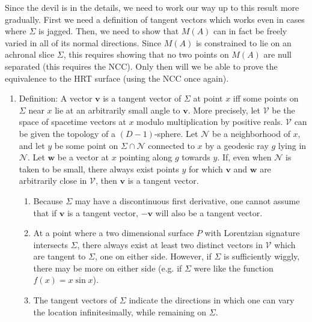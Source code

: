 \documentclass{article}
\begin{document}
Since the devil is in the details, we need to work our way up to this result more gradually.  First we need a definition of tangent vectors which works even in cases where $\Sigma$ is jagged.  Then, we need to show that $M(A)$ can in fact be freely varied in all of its normal directions.  Since $M(A)$ is constrained to lie on an achronal slice $\Sigma$, this requires showing that no two points on $M(A)$ are null separated (this requires the NCC).  Only then will we be able to prove the equivalence to the HRT surface (using the NCC once again).

\begin{enumerate}[resume]
\item Definition: A vector $\mathbf{v}$ is a tangent vector of $\Sigma$ at point $x$ iff some points on $\Sigma$ near $x$ lie at an arbitrarily small angle to $\mathbf{v}$.  More precisely, let $\mathcal{V}$ be the space of spacetime vectors at $x$ modulo multiplication by positive reals.  $\mathcal{V}$ can be given the topology of a $(D-1)$-sphere.  Let $\mathcal{N}$ be a neighborhood of $x$, and let $y$ be some point on $\Sigma \cap \mathcal{N}$ connected to $x$ by a geodesic ray $g$ lying in $\mathcal{N}$.  Let $\mathbf{w}$ be a vector at $x$ pointing along $g$ towards $y$.  If, even when $\mathcal{N}$ is taken to be small, there always exist points $y$ for which $\mathbf{v}$ and $\mathbf{w}$ are arbitrarily close in $\mathcal{V}$, then $\mathbf{v}$ is a tangent vector.
	\begin{enumerate}
	\item Because $\Sigma$ may have a discontinuous first derivative, one cannot assume that if $\mathbf{v}$ is a tangent vector, $-\mathbf{v}$ will also be a tangent vector.
	\item At a point where a two dimensional surface $P$ with Lorentzian signature intersects $\Sigma$, there always exist at least two distinct vectors in $\mathcal{V}$ which are tangent to $\Sigma$, one on either side.  However, if $\Sigma$ is sufficiently wiggly, there may be more on either side (e.g. if $\Sigma$ were like the function $f(x) = x \sin x$).
	\item The tangent vectors of $\Sigma$ indicate the directions in which one can vary the location infinitesimally, while remaining on $\Sigma$.
	\end{enumerate}


\end{enumerate}
\end{document}

